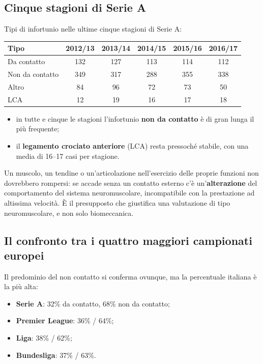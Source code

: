 \subsection{Cinque stagioni di Serie A}

Tipi di infortunio nelle ultime cinque stagioni di Serie A:

\begin{table}[htbp]
  \centering
  \small
  \renewcommand{\arraystretch}{1.3}
  \begin{tabularx}{\textwidth}{|X|c|c|c|c|c|}
    \hline
    \textbf{Tipo} & \textbf{2012/13} & \textbf{2013/14} & \textbf{2014/15} & \textbf{2015/16} &
      \textbf{2016/17} \\
    \hline
    Da contatto & 132 & 127 & 113 & 114 & 112 \\
    \hline
    Non da contatto & 349 & 317 & 288 & 355 & 338 \\
    \hline
    Altro & 84 & 96 & 72 & 73 & 50 \\
    \hline
    LCA & 12 & 19 & 16 & 17 & 18 \\
    \hline
  \end{tabularx}
\end{table}

\begin{itemize}
  \item in tutte e cinque le stagioni l'infortunio \textbf{non da contatto} è di gran lunga il più
    frequente;
  \item il \textbf{legamento crociato anteriore} (LCA) resta pressoché stabile, con una media di
    16--17 casi per stagione.
\end{itemize}

Un muscolo, un tendine o un'articolazione nell'esercizio delle proprie funzioni non dovrebbero
rompersi: se accade senza un contatto esterno c'è un'\textbf{alterazione} del comportamento del
sistema neuromuscolare, incompatibile con la prestazione ad altissima velocità. È il presupposto che
giustifica una valutazione di tipo neuromuscolare, e non solo biomeccanica.

\subsection{Il confronto tra i quattro maggiori campionati europei}

Il predominio del non contatto si conferma ovunque, ma la percentuale italiana è la più alta:
\begin{itemize}
  \item \textbf{Serie A}: 32\% da contatto, 68\% non da contatto;
  \item \textbf{Premier League}: 36\% / 64\%;
  \item \textbf{Liga}: 38\% / 62\%;
  \item \textbf{Bundesliga}: 37\% / 63\%.
\end{itemize}

